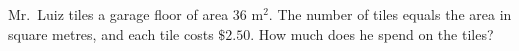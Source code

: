 Mr.\ Luiz tiles a garage floor of area $36\text{ m}^2$. The number of tiles equals the area in square metres, and each tile costs $\$2.50$. How much does he spend on the tiles?

